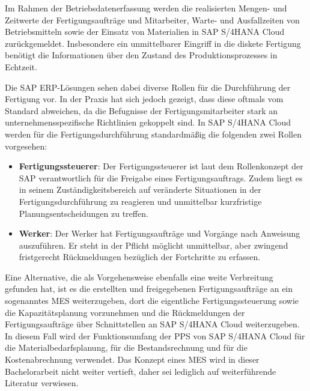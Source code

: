 Im Rahmen der Betriebsdatenerfassung werden die realisierten Mengen- und Zeitwerte der Fertigungsaufträge und Mitarbeiter, Warte- und Ausfallzeiten von Betriebsmitteln sowie der Einsatz von Materialien in SAP S/4HANA Cloud zurückgemeldet. Insbesondere ein unmittelbarer Eingriff in die diskete Fertigung benötigt die Informationen über den Zustand des Produktionsprozesses in Echtzeit. 

Die SAP \ac{ERP}-Lösungen sehen dabei diverse Rollen für die Durchführung der Fertigung vor. In der Praxis hat sich jedoch gezeigt, dass diese oftmals vom Standard abweichen, da die Befugnisse der Fertigungsmitarbeiter stark an unternehmensspezifische Richtlinien gekoppelt sind.
\cite{Frick.2008}
In SAP S/4HANA Cloud werden für die Fertigungsdurchführung standardmäßig die folgenden zwei Rollen vorgesehen:
\begin{itemize}
    \item \textbf{Fertigungssteuerer}: Der Fertigungssteuerer ist laut dem Rollenkonzept der SAP verantwortlich für die Freigabe eines Fertigungsauftrags. Zudem liegt es in seinem Zuständigkeitsbereich auf veränderte Situationen in der Fertigungsdurchführung zu reagieren und unmittelbar kurzfristige Planungsentscheidungen zu treffen.
    \item \textbf{Werker}: Der Werker hat Fertigungsaufträge und Vorgänge nach Anweisung auszuführen. Er steht in der Pflicht möglicht unmittelbar, aber zwingend fristgerecht Rückmeldungen bezüglich der Fortchritte zu erfassen.
\end{itemize}

Eine Alternative, die als Vorgehensweise ebenfalls eine weite Verbreitung gefunden hat, ist es die erstellten und freigegebenen Fertigungsaufträge an ein sogenanntes \ac{MES} weiterzugeben, dort die eigentliche Fertigungssteuerung sowie die Kapazitätsplanung vorzunehmen und die Rückmeldungen der Fertigungsaufträge über Schnittstellen an SAP S/4HANA Cloud weiterzugeben. 
\cite{Gerberich.2011}
In diesem Fall wird der Funktionsumfang der \ac{PPS} von SAP S/4HANA Cloud  für die Materialbedarfsplanung, für die Bestandsrechnung und für die Kostenabrechnung verwendet.
\cite{Dickersbach.2014}
Das Konzept eines \ac{MES} wird in dieser Bachelorarbeit nicht weiter vertieft, daher sei lediglich auf weiterführende Literatur verwiesen.
\cite{Kletti.2007} \cite{Gerberich.2011}


